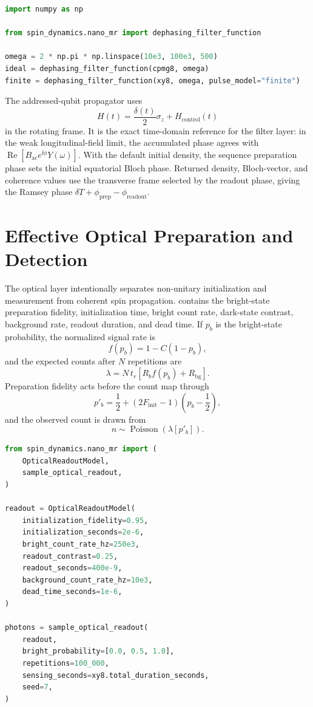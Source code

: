 \begin{lstlisting}[language=Python]
import numpy as np

from spin_dynamics.nano_mr import dephasing_filter_function

omega = 2 * np.pi * np.linspace(10e3, 100e3, 500)
ideal = dephasing_filter_function(cpmg8, omega)
finite = dephasing_filter_function(xy8, omega, pulse_model="finite")
\end{lstlisting}

The addressed-qubit propagator uses
\[
  H(t)=\frac{\delta(t)}{2}\sigma_z+H_\mathrm{control}(t)
\]
in the rotating frame. It is the exact time-domain reference for the filter
layer: in the weak longitudinal-field limit, the accumulated phase agrees with
\(\operatorname{Re}[B_\mathrm{ac}e^{\ii\phi}Y(\omega)]\). With the default
initial density, the sequence preparation phase sets the initial equatorial
Bloch phase. Returned density, Bloch-vector, and coherence values use the
transverse frame selected by the readout phase, giving the Ramsey phase
\(\delta T+\phi_\mathrm{prep}-\phi_\mathrm{readout}\).

\section{Effective Optical Preparation and Detection}

The optical layer intentionally separates non-unitary initialization and
measurement from coherent spin propagation. 
contains the bright-state preparation fidelity, initialization time, bright
count rate, dark-state contrast, background rate, readout duration, and dead
time. If \(p_b\) is the bright-state probability, the normalized signal rate is
\[
  f(p_b)=1-C(1-p_b),
\]
and the expected counts after \(N\) repetitions are
\[
  \lambda=N\,t_r
  \left[R_b f(p_b)+R_\mathrm{bg}\right].
\]
Preparation fidelity acts before the count map through
\[
  p'_b=\frac12+(2F_\mathrm{init}-1)\left(p_b-\frac12\right),
\]
and the observed count is drawn from
\[
  n\sim\operatorname{Poisson}(\lambda[p'_b]).
\]

\begin{lstlisting}[language=Python]
from spin_dynamics.nano_mr import (
    OpticalReadoutModel,
    sample_optical_readout,
)

readout = OpticalReadoutModel(
    initialization_fidelity=0.95,
    initialization_seconds=2e-6,
    bright_count_rate_hz=250e3,
    readout_contrast=0.25,
    readout_seconds=400e-9,
    background_count_rate_hz=10e3,
    dead_time_seconds=1e-6,
)

photons = sample_optical_readout(
    readout,
    bright_probability=[0.0, 0.5, 1.0],
    repetitions=100_000,
    sensing_seconds=xy8.total_duration_seconds,
    seed=7,
)
\end{lstlisting}


